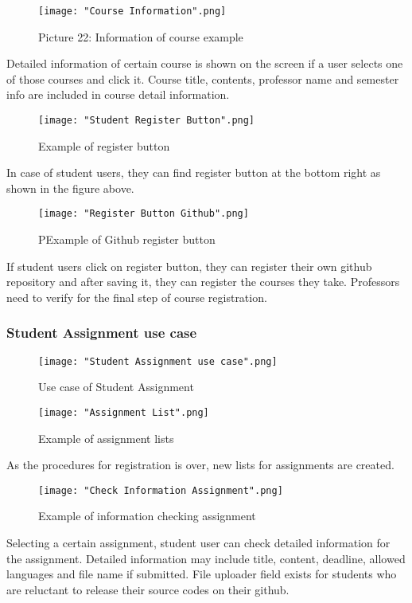 \documentclass[10pt,journal,compsoc]{IEEEtran}
\begin{document}
\begin{figure}[H]
\centering
\texttt{[image: "Course Information".png]}
{\caption*{Picture 22: Information of course example}}
\end{figure}
Detailed information of certain course is shown on the screen if a user selects one of those courses and click it. Course title, contents, professor name and semester info are included in course detail information. 

\begin{figure}[H]
\centering
\texttt{[image: "Student Register Button".png]}
{\caption*{Example of register button}}
\end{figure}
In case of student users, they can find register button at the bottom right as shown in the figure above. 

\begin{figure}[H]
\centering
\texttt{[image: "Register Button Github".png]}
{\caption*{PExample of Github register button}}
\end{figure}
 \setlength{\belowcaptionskip}{-10pt}


If student users click on register button, they can register their own github repository and after saving it, they can register the courses they take. Professors need to verify for the final step of course registration. 


\subsubsection{Student Assignment use case}
\begin{figure}[H]
\centering
\texttt{[image: "Student Assignment use case".png]}
{\caption*{Use case of Student Assignment}}
\end{figure}

\begin{figure}[H]
\centering
\texttt{[image: "Assignment List".png]}
{\caption*{Example of assignment lists}}
\end{figure}
As the procedures for registration is over, new lists for assignments are created.

\begin{figure}[H]
\centering
\texttt{[image: "Check Information Assignment".png]}
{\caption*{Example of information checking  assignment}}
\end{figure}
Selecting a certain assignment, student user can check detailed information for the assignment. Detailed information may include title, content, deadline, allowed languages and file name if submitted. File uploader field exists for students who are reluctant to release their source codes on their github.
\end{document}

